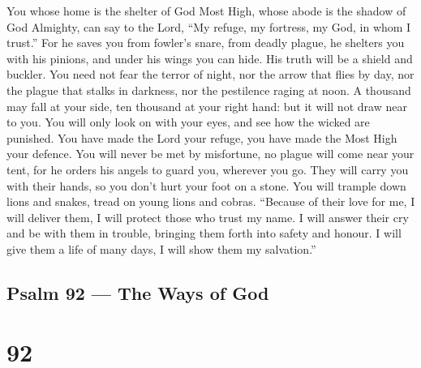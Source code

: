  You whose home is the shelter of God Most High, whose abode
is the shadow of God Almighty,  can say to the Lord, ``My
refuge, my fortress, my God, in whom I trust.''  For he
saves you from fowler's snare, from deadly plague,  he
shelters you with his pinions, and under his wings you can hide. His
truth will be a shield and buckler.  You need not fear the
terror of night, nor the arrow that flies by day,  nor the
plague that stalks in darkness, nor the pestilence raging at noon.
 A thousand may fall at your side, ten thousand at your
right hand: but it will not draw near to you.  You will only
look on with your eyes, and see how the wicked are punished.
 You have made the Lord your refuge, you have made the Most
High your defence.  You will never be met by misfortune, no
plague will come near your tent,  for he orders his angels
to guard you, wherever you go.  They will carry you with
their hands, so you don't hurt your foot on a stone.  You
will trample down lions and snakes, tread on young lions and cobras.
 ``Because of their love for me, I will deliver them, I
will protect those who trust my name.  I will answer their
cry and be with them in trouble, bringing them forth into safety and
honour.  I will give them a life of many days, I will show
them my salvation.''

\hypertarget{psalm-92-the-ways-of-god}{%
\subsection{Psalm 92 --- The Ways of
God}\label{psalm-92-the-ways-of-god}}

\hypertarget{section-91}{%
\section{92}\label{section-91}}


